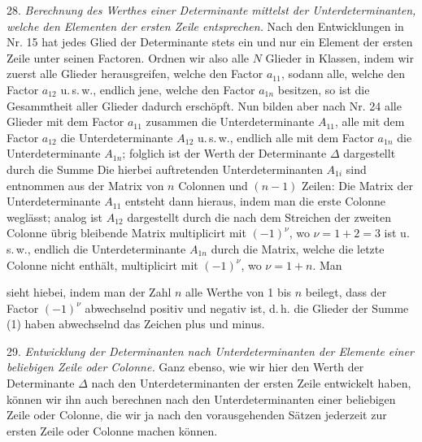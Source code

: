 28. \textit{Berechnung des Werthes einer Determinante mittelst der
Unterdeterminanten, welche den Elementen der ersten Zeile entsprechen.}
Nach den Entwicklungen in Nr. 15 hat jedes Glied der Determinante stets ein
und nur ein Element der ersten Zeile unter seinen Factoren. Ordnen wir also
alle $N$ Glieder in Klassen, indem wir zuerst alle Glieder herausgreifen,
welche den Factor $a_{11}$, sodann alle, welche den Factor $a_{12}$
u.\,s.\,w., endlich jene, welche den Factor $a_{1n}$ besitzen, so ist die
Gesammtheit aller Glieder dadurch erschöpft. Nun bilden aber nach Nr. 24
alle Glieder mit dem Factor $a_{11}$ zusammen die Unterdeterminante $A_{11}$,
alle mit dem Factor $a_{12}$ die Unterdeterminante $A_{12}$ u.\,s.\,w.,
endlich alle mit dem Factor $a_{1n}$ die Unterdeterminante $A_{1n}$; folglich
ist der Werth der Determinante $\Delta$ dargestellt durch die Summe
Die hierbei auftretenden Unterdeterminanten $A_{1i}$ sind entnommen aus der
Matrix von $n$ Colonnen und $(n-1)$ Zeilen:
Die Matrix der Unterdeterminante $A_{11}$ entsteht dann hieraus, indem man
die erste Colonne weglässt; analog ist $A_{12}$ dargestellt durch die nach
dem Streichen der zweiten Colonne übrig bleibende Matrix multiplicirt mit
$(-1)^\nu$, wo $\nu=1+2=3$ ist u.\,s.\,w., endlich die Unterdeterminante
$A_{1n}$ durch die Matrix, welche die letzte Colonne nicht enthält,
multiplicirt mit $(-1)^\nu$, wo $\nu=1+n$. Man


sieht hiebei, indem man der Zahl $n$ alle Werthe von 1 bis $n$ beilegt, dass
der Factor $(-1)^\nu$ abwechselnd positiv und negativ ist, d.\,h. die
Glieder der Summe (1) haben abwechselnd das Zeichen plus und minus.

29. \textit{Entwicklung der Determinanten nach Unterdeterminanten der
Elemente einer beliebigen Zeile oder Colonne.} Ganz ebenso, wie wir hier den
Werth der Determinante $\Delta$ nach den Unterdeterminanten der ersten
Zeile entwickelt haben, können wir ihn auch berechnen nach den
Unterdeterminanten einer beliebigen Zeile oder Colonne, die wir ja nach den
vorausgehenden Sätzen jederzeit zur ersten Zeile oder Colonne machen können.

